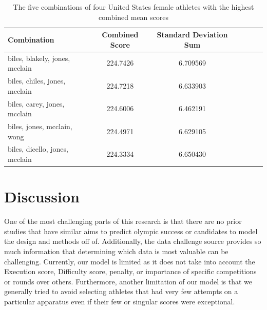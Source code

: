 \documentclass[12pt]{article}
\begin{document}
\begin{table}[tbp]
  \caption{The five combinations of four United States female athletes with the highest combined mean scores}
  \label{tab:tableAA4}
\centering
\begin{tabular}[t]{lccllll}
 \toprule
Combination & Combined Score & Standard Deviation Sum\\
\midrule
biles, blakely, jones, mcclain & 224.7426 & 6.709569\\
\midrule
biles, chiles, jones, mcclain & 224.7218 & 6.633903\\
\midrule
biles, carey, jones, mcclain & 224.6006 & 6.462191\\
\midrule
biles, jones, mcclain, wong & 224.4971 & 6.629105\\
\midrule
biles, dicello, jones, mcclain & 224.3334 & 6.650430\\
\bottomrule
\end{tabular}
\end{table} 




 



\section{Discussion}
\label{sec:dis}

One of the most challenging parts of this research is that there are no prior studies that have similar
aims to predict olympic success or candidates to model the design and methods off of. Additionally, 
the data challenge source provides so much information that determining which data is most valuable 
can be challenging. Currently, our model is limited as it does not take into account the 
Execution score, Difficulty score, penalty, or importance of specific competitions or rounds over others. 
Furthermore, another limitation of our model is that we generally tried to avoid selecting athletes that
had very few attempts on a particular apparatus even if their few or singular scores were exceptional.



\end{document}
